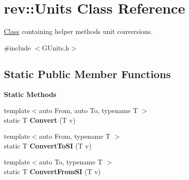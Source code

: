 \hypertarget{classrev_1_1_units}{}\section{rev\+::Units Class Reference}
\label{classrev_1_1_units}


\mbox{\hyperlink{struct_class}{Class}} containing helper methods unit conversions.  




{\ttfamily \#include $<$G\+Units.\+h$>$}

\subsection*{Static Public Member Functions}
\begin{Indent}\textbf{ Static Methods}\par
\begin{DoxyCompactItemize}
\item 
\mbox{\label{classrev_1_1_units_a70202264f1f94271aa12a6fcbf3d05d6}} 
{\footnotesize template$<$auto From, auto To, typename T $>$ }\\static T {\bfseries Convert} (T v)
\item 
\mbox{\label{classrev_1_1_units_a118c348ef169b009b6995b70983c0b73}} 
{\footnotesize template$<$auto From, typename T $>$ }\\static T {\bfseries Convert\+To\+SI} (T v)
\item 
\mbox{\label{classrev_1_1_units_aaf02cdb807948b72e6e14b5009d41214}} 
{\footnotesize template$<$auto To, typename T $>$ }\\static T {\bfseries Convert\+From\+SI} (T v)
\end{DoxyCompactItemize}
\end{Indent}

